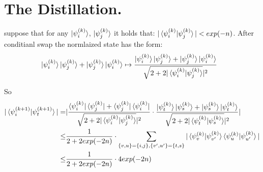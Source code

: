 \documentclass[manuscript,screen,review]{acmart}
\begin{document}
\section{The Distillation.}
suppose that for any $\ket{\psi^{(k)}_{i}}$, $\ket{\psi^{(k)}_{j}}$ it holds that: $|\braket{\psi^{(k)}_{i}|\psi^{(k)}_{j}}| < exp(-n)$. After conditianl swap the normlaized state has the form:  
\begin{equation*}
  \begin{split}
    & \ket{\psi^{(k)}_{i}}\ket{\psi^{(k)}_{j}}+\ket{\psi^{(k)}_{j}}\ket{\psi^{(k)}_{i}} \mapsto \frac{ \ket{\psi^{(k)}_{i}}\ket{\psi^{(k)}_{j}}+\ket{\psi^{(k)}_{j}}\ket{\psi^{(k)}_{i}} }{ \sqrt{2 + 2 |\braket{\psi^{(k)}_{i}|\psi^{(k)}_{j}}}|^2 } 
  \end{split}
\end{equation*}

So 
\begin{equation*}
  \begin{split}
  |\braket{\psi^{(k+1)}_{i}|\psi^{(k+1)}_{t}}| =& | \frac{ \bra{\psi^{(k)}_{i}}\bra{\psi^{(k)}_{j}}+\bra{\psi^{(k)}_{j}}\bra{\psi^{(k)}_{i}} }{ \sqrt{2 + 2 |\braket{\psi^{(k)}_{i}|\psi^{(k)}_{j}}}|^2 } \cdot \frac{ \ket{\psi^{(k)}_{t}}\ket{\psi^{(k)}_{s}}+\ket{\psi^{(k)}_{s}}\ket{\psi^{(k)}_{t}} }{ \sqrt{2 + 2 |\braket{\psi^{(k)}_{t}|\psi^{(k)}_{s}}}|^2 } | \\
  \le & \frac{1}{2+2exp(-2n)}\cdot \sum_{\{v,u\} = \{i,j\},\{v^{\prime},u^{\prime}\} = \{t,s\}}{ |\braket{\psi^{(k)}_{v}|\psi^{(k)}_{v^{\prime}}} \braket{\psi^{(k)}_{u}|\psi^{(k)}_{u^{\prime}}}|} \\ 
  \le &\frac{1}{2+2exp(-2n)} \cdot 4 exp(-2n)
  \end{split}
\end{equation*}
\end{document}
